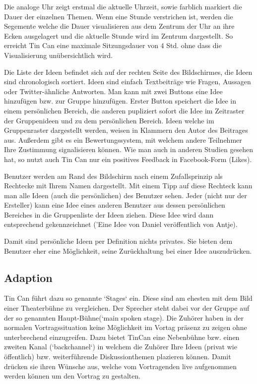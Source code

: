 Die analoge Uhr zeigt erstmal die aktuelle Uhrzeit, sowie farblich markiert die
Dauer der einzelnen Themen.
Wenn eine Stunde verstrichen ist, werden die Segemente welche die Dauer
visualisieren aus dem Zentrum der Uhr an ihre Ecken ausgelagert und die aktuelle
Stunde wird im Zentrum dargestellt. So erreicht Tin Can eine maximale
Sitzungsdauer von 4 Std. ohne dass die Visualisierung unübersichtlich wird.

Die Liste der Ideen befindet sich auf der rechten Seite des Bildschirmes, die
Ideen sind chronologisch sortiert. Ideen sind einfach Textbeiträge wie Fragen,
Aussagen oder Twitter-ähnliche Antworten. Man kann mit zwei Buttons eine Idee
hinzufügen bzw. zur Gruppe hinzufügen. Erster Button speichert die Idee in einem
persönlichen Bereich, die anderen pupliziert sofort die Idee im Zeitraster der
Gruppenideen und zu dem persönlichen Bereich. Ideen welche im Gruppenraster
dargestellt werden, weisen in Klammern den Autor des Beitrages aus. Außerdem
gibt es ein Bewertungssystem, mit welchem andere Teilnehmer Ihre Zustimmung
signalisieren können. Wie man auch in anderen Studien gesehen hat, so nutzt auch
Tin Can nur ein positives Feedback in Facebook-Form (Likes).

Benutzer werden am Rand des Bildschirm nach einem Zufallsprinzip als Rechtecke
mit Ihrem Namen dargestellt. Mit einem Tipp auf diese Rechteck kann man alle
Ideen (auch die persönlichen) des Benutzer sehen. Jeder (nicht nur der
Ersteller) kann eine Idee eines anderen Benutzer aus dessen persönlichen
Bereiches in die Gruppenliste der Ideen ziehen. Diese Idee wird dann
entsprechend gekennzeichnet ('Eine Idee von Daniel veröffentlich von Antje).

Damit sind persönliche Ideen per Definition nichts privates. Sie bieten dem
Benutzer eher eine Möglichkeit, seine Zurückhaltung bei einer Idee auszudrücken.

\subsection{Adaption}
Tin Can führt dazu so genannte `Stages` ein. Diese sind am ehesten mit dem Bild
einer Theaterbühne zu vergleichen. Der Sprecher steht dabei vor der Gruppe auf
der so genannten Haupt-Bühne(`main spoken stage). Die Zuhörer haben in der
normalen Vortragssituation keine Möglichkeit im Vortag präsenz zu zeigen ohne
unterbrechend einzugreifen. Dazu bietet TinCan eine Nebenbühne bzw. einen
zweiten Kanal (`backchannel`) in welchem die Zuhörer Ihre Ideen (privat wie
öffentlich) bzw. wei\-ter\-führ\-en\-de Dis\-kus\-sion\-themen plazieren können.
Damit drücken sie ihren Wünsche aus, welche vom Vortragenden live aufgenommen
werden können um den Vortrag zu gestalten.

